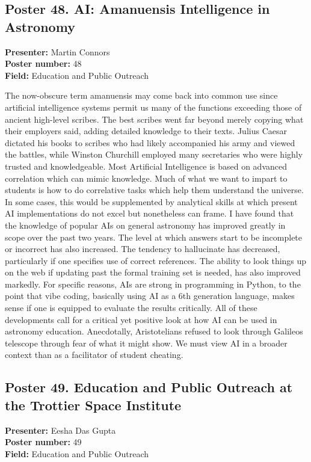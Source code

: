 \hypertarget{poster-abstract-talk-270}{}\label{poster-abstract-page-talk-270}
\subsection*{Poster 48. AI: Amanuensis Intelligence in Astronomy}
\textbf{Presenter:} Martin Connors\\
\textbf{Poster number:} 48\\
\textbf{Field:} Education and Public Outreach

The now-obscure term amanuensis may come back into common use since artificial intelligence systems permit us many of the functions exceeding those of ancient high-level scribes. The best scribes went far beyond merely copying what their employers said, adding detailed knowledge to their texts. Julius Caesar dictated his books to scribes who had likely accompanied his army and viewed the battles, while Winston Churchill employed many secretaries who were highly trusted and knowledgeable. Most Artificial Intelligence is based on advanced correlation which can mimic knowledge. Much of what we want to impart to students is how to do correlative tasks which help them understand the universe. In some cases, this would be supplemented by analytical skills at which present AI implementations do not excel but nonetheless can frame. I have found that the knowledge of popular AIs on general astronomy has improved greatly in scope over the past two years. The level at which answers start to be incomplete or incorrect has also increased. The tendency to hallucinate has decreased, particularly if one specifies use of correct references. The ability to look things up on the web if updating past the formal training set is needed, has also improved markedly. For specific reasons, AIs are strong in programming in Python, to the point that vibe coding, basically using AI as a 6th generation language, makes sense if one is equipped to evaluate the results critically. All of these developments call for a critical yet positive look at how AI can be used in astronomy education. Anecdotally, Aristotelians refused to look through Galileos telescope through fear of what it might show. We must view AI in a broader context than as a facilitator of student cheating.

\hypertarget{poster-abstract-talk-109}{}\label{poster-abstract-page-talk-109}
\subsection*{Poster 49. Education and Public Outreach at the Trottier Space Institute}
\textbf{Presenter:} Eesha Das Gupta\\
\textbf{Poster number:} 49\\
\textbf{Field:} Education and Public Outreach

